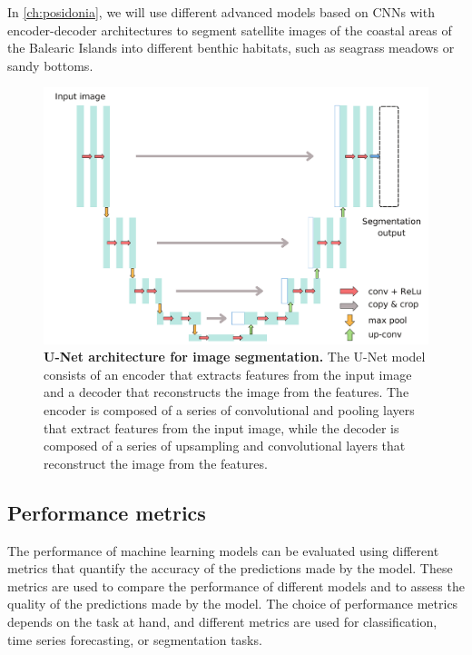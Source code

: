 In \cref{ch:posidonia}, we will use different advanced models based on CNNs
with encoder-decoder architectures to segment satellite images of the coastal
areas of the Balearic Islands into different benthic habitats, such as
seagrass meadows or sandy bottoms.

\begin{figure}[H]
  \centering
  \includegraphics[width=1\textwidth]{Figures/Unet.pdf}
  \caption[U-Net architecture for image segmentation]{
    \textbf{U-Net architecture for image segmentation.} The U-Net model
    consists of an encoder that extracts features from the input image and a
    decoder that reconstructs the image from the features. The encoder is
    composed of a series of convolutional and pooling layers that extract
    features from the input image, while the decoder is composed of a series
    of
    upsampling and convolutional layers that reconstruct the image from the
    features.}
  \label{fig:Unet}
\end{figure}

\subsection{Performance metrics}

The performance of machine learning models can be evaluated using different
metrics that quantify the accuracy of the predictions made by the model.
These
metrics are used to compare the performance of different models and to assess
the quality of the predictions made by the model. The choice of performance
metrics depends on the task at hand, and different metrics are used for
classification, time series forecasting, or segmentation tasks.


